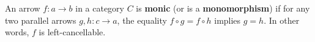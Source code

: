 An arrow $f: a \rightarrow b$ in a category $C$ is \textbf{monic} (or is a \textbf{monomorphism}) if for any two parallel arrows $g, h: c \rightarrow a$, the equality $f \circ g = f \circ h$ implies $g = h$. In other words, $f$ is left-cancellable.